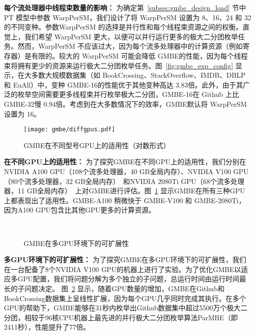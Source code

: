 \textbf{每个流处理器中线程束数量的影响：} 为确定第~\ref{subsec:gmbe_design_load} 节中 PT 模型中参数 \textsf{WarpPerSM}，我们设计了将 \textsf{WarpPerSM} 设置为 8、16、24 和 32 的不同变种。参数\textsf{WarpPerSM} 的选择是并行性和每个线程束资源之间的权衡。直觉上，我们希望 \textsf{WarpPerSM} 更大，以便可以并行运行更多的极大二分团枚举任务。然而，\textsf{WarpPerSM} 不应该过大，因为每个流多处理器中的计算资源（例如寄存器）是有限的。较大的 \textsf{WarpPerSM} 可能会降低 GMBE的性能，因为每个线程束将拥有更少的资源来运行极大二分团枚举任务。图~\ref{fig:gmbe_exp_config} 显示，在大多数大规模数据集（如 BookCrossing、StackOverflow、IMDB、DBLP 和 EuAll）中，变种 GMBE-16的性能优于其他变种高达 3.83倍。此外，由于其广泛的枚举空间需要更多线程束并行枚举极大二分团，GMBE-16在 Github 上比 GMBE-32慢 0.94倍。考虑到在大多数情况下的效率，GMBE默认将 \textsf{WarpPerSM} 设置为 16。

\begin{figure} [H]
	\centering
	\texttt{[image: gmbe/diffgpus.pdf]}	
	\vspace{0.1in}
  \caption{GMBE在不同型号GPU上的适用性（对数形式）}
	\label{fig:gmbe_exp_diff}
\end{figure}

\textbf{在不同GPU上的适用性：} 为了探究GMBE在不同GPU上的适用性，我们分别在NVIDIA A100 GPU（108个流多处理器，40 GB全局内存）、NVIDIA V100 GPU（80个流多处理器，32 GB全局内存）~\cite{NVIDIA-V100}和NVIDIA 2080Ti GPU（68个流多处理器，11 GB全局内存）~\cite{NVIDIA-2080Ti}上对GMBE进行评估。图~\ref{fig:gmbe_exp_diff} 显示GMBE在所有三种GPU上都表现出了适用性。GMBE-A100 稍微快于 GMBE-V100 和 GMBE-2080Ti，因为A100 GPU包含比其他GPU更多的计算资源。

\begin{figure} [H]
	\centering

	 \\


	\caption{GMBE在多GPU环境下的可扩展性}

	\label{fig:gmbe_exp_scale}

\end{figure}

\textbf{多GPU环境下的可扩展性：} 为了探究GMBE在多GPU环境下的可扩展性，我们在一台配备了8个NVIDIA V100 GPU的机器上进行了实验。为了优化GMBE以适应多GPU配置，我们将问题分解为多个独立的子问题，总运行时间由运行时间最长的子问题决定。 图~\ref{fig:gmbe_exp_scale} 显示，随着GPU数量的增加，GMBE在Github和BookCrossing数据集上呈线性扩展，因为每个GPU几乎同时完成其执行。在多个GPU的帮助下，GMBE能够在31秒内枚举出Github数据集中超过5500万个极大二分团，相较于96核CPU机器上最先进的并行极大二分团枚举算法ParMBE（即2411秒），性能提升了77倍。

